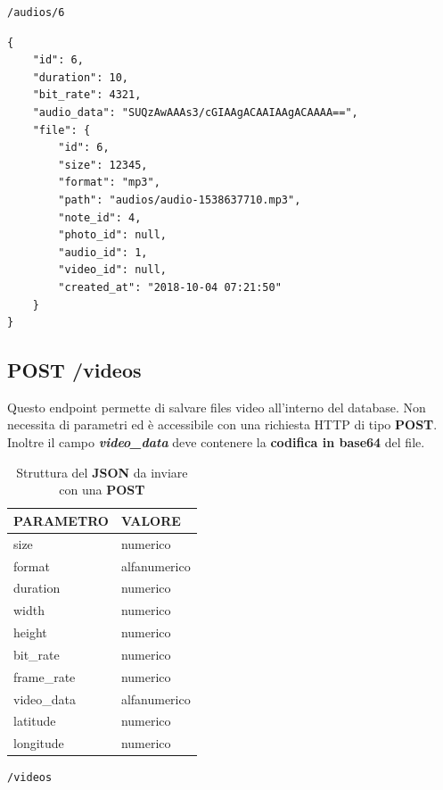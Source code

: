 \begin{lstlisting}[caption=Esempio di richiesta \textbf{GET}, xleftmargin=.26\textwidth, xrightmargin=.26\textwidth]
           /audios/6
\end{lstlisting}

\begin{lstlisting}[caption=Esempio \textbf{JSON} restituito con richiesta \textbf{GET /audios/\{id\}}]
{
	"id": 6,
	"duration": 10,
	"bit_rate": 4321,
	"audio_data": "SUQzAwAAAs3/cGIAAgACAAIAAgACAAAA==",
	"file": {
		"id": 6,
		"size": 12345,
		"format": "mp3",
		"path": "audios/audio-1538637710.mp3",
		"note_id": 4,
		"photo_id": null,
		"audio_id": 1,
		"video_id": null,
		"created_at": "2018-10-04 07:21:50"
	}
}
\end{lstlisting}

\subsection{POST /videos}
Questo endpoint permette di salvare files video all'interno del database. Non necessita di parametri ed è accessibile con una richiesta HTTP di tipo \textbf{POST}. Inoltre il campo \textit{\textbf{video\_data}} deve contenere la \textbf{codifica in base64} del file.

\begin{table}[!h]
	\centering
	\begin{tabular}{@{}ll@{}}
		\toprule
		\textbf{PARAMETRO} & \textbf{VALORE}  \\ \midrule
		size               & numerico\\ 
		format             & alfanumerico\\
		duration           & numerico\\
		width              & numerico\\
		height             & numerico\\
		bit\_rate          & numerico\\
		frame\_rate        & numerico\\
		video\_data        & alfanumerico\\
		latitude           & numerico\\ 
		longitude          & numerico\\ \bottomrule		
	\end{tabular}
\caption{Struttura del \textbf{JSON} da inviare con una \textbf{POST}}
\end{table}

\begin{lstlisting}[caption=Esempio di richiesta \textbf{POST}, xleftmargin=.26\textwidth, xrightmargin=.26\textwidth]
	   /videos	
\end{lstlisting}

